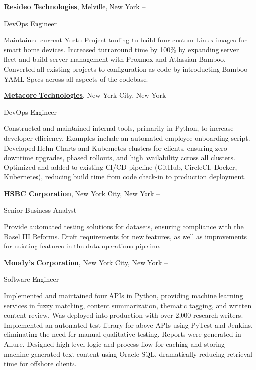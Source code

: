 \documentclass[letterpaper,MMMyyyy,nonstopmode]{simpleresumecv}
\begin{document}
\begin{Body}
\BigGap
\Entry
\href{https://resideo.com/}
{\textbf{Resideo Technologies}},
Melville, New York
\hfill
{} --

\Gap
\BulletItem
DevOps Engineer
\begin{Detail}
\SubBulletItem
Maintained current Yocto Project tooling to build four custom Linux images for smart home devices.
\SubBulletItem
Increased turnaround time by 100\% by expanding server fleet and build server management with Proxmox and Atlassian Bamboo.
\SubBulletItem
Converted all existing projects to configuration-as-code by introducting Bamboo YAML Specs across all aspects of the codebase.
\end{Detail}

\BigGap
\Entry
\href{https://metacore.tech/}
{\textbf{Metacore Technologies}},
New York City, New York
\hfill
{} --

\Gap
\BulletItem
DevOps Engineer
\begin{Detail}
\SubBulletItem
Constructed and maintained internal tools, primarily in Python, to increase developer efficiency. Examples include an automated employee onboarding script.
\SubBulletItem
Developed Helm Charts and Kubernetes clusters for clients, ensuring zero-downtime upgrades, phased rollouts, and high availability across all clusters.
\SubBulletItem
Optimized and added to existing CI/CD pipeline (GitHub, CircleCI, Docker, Kubernetes), reducing build time from code check-in to production deployment.
\end{Detail}

\BigGap
\Entry
\href{https://www.hsbc.com/}
{\textbf{HSBC Corporation}},
New York City, New York
\hfill
{} --

\Gap
\BulletItem
Senior Business Analyst
\begin{Detail}
\SubBulletItem
Provide automated testing solutions for datasets, ensuring compliance with the Basel III Reforms.
\SubBulletItem
Draft requirements for new features, as well as improvements for existing features in the data operations pipeline.
\end{Detail}

\BigGap
\Entry
\href{http://www.moodys.com}
{\textbf{Moody's Corporation}},
New York City, New York
\hfill
{} --

\Gap
\BulletItem
Software Engineer
\begin{Detail}
\SubBulletItem
Implemented and maintained four APIs in Python, providing machine learning services in fuzzy matching, content summarization, thematic tagging, and written content review. Was deployed into production with over 2,000 research writers.
\SubBulletItem
Implemented an automated test library for above APIs using PyTest and Jenkins, eliminating the need for manual qualitative testing. Reports were generated in Allure.
\SubBulletItem
Designed high-level logic and process flow for caching and storing machine-generated text content using Oracle SQL, dramatically reducing retrieval time for offshore clients.
\end{Detail}


\end{Body}
\end{document}
